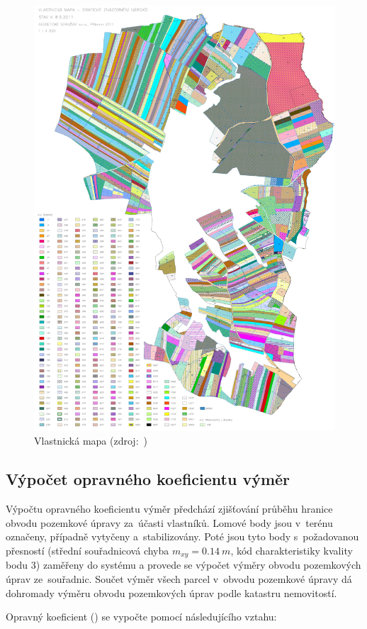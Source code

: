 	\begin{figure}[H]
		\centering
		\includegraphics[width=.8\textwidth]{./pictures/vlastnicka_mapa.pdf}
		\caption[Vlastnická mapa]{Vlastnická mapa (zdroj:~\citep{skvorec})}
		\label{fig:vlastnicka_mapa}
 	\end{figure}

\subsection{Výpočet opravného koeficientu výměr}
\label{vypocet_ok}

Výpočtu opravného koeficientu výměr předchází zjišťování průběhu hranice obvodu pozemkové úpravy za~účasti vlastníků. Lomové body jsou v~terénu označeny, případně vytyčeny a~stabilizovány. Poté jsou tyto body s~požadovanou přesností (střední souřadnicová chyba $m_{xy}=0.14~m$, kód charakteristiky kvality bodu $3$) zaměřeny do systému  a provede se výpočet výměry obvodu pozemkových úprav ze~souřadnic. Součet výměr všech parcel v~obvodu pozemkové úpravy dá dohromady výměru obvodu pozemkových úprav podle katastru nemovitostí.

Opravný koeficient () se vypočte pomocí následujícího vztahu:

